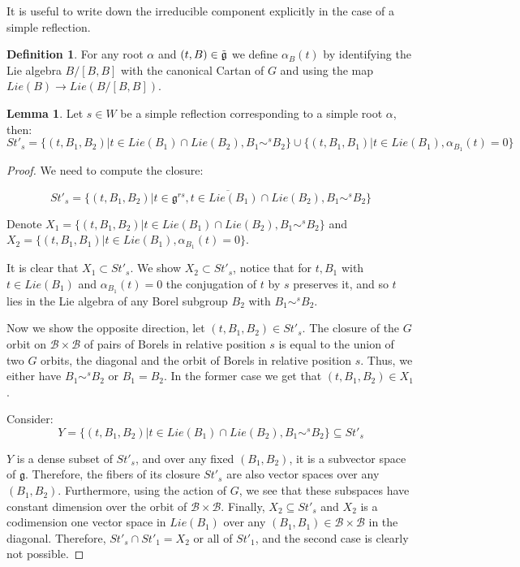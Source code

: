 \documentclass[12pt]{article}
\newcommand{\B}{\mathcal{B}}
\theoremstyle{plain}
\theoremstyle{definition}
\newtheorem{lemma}[theorem]{Lemma}
\newtheorem{defn}[theorem]{Definition}
\begin{document}
It is useful to write down the irreducible component explicitly in the case of a simple reflection. 


\begin{defn}\label{def:functionl alpha_s}
For any root $\alpha$ and $(t,B)\in \Tilde{\mathfrak{g}}$ we define $\alpha_B(t)$ by identifying the Lie algebra $B/[B,B]$ with the canonical Cartan of $G$ and using the map $Lie(B)\rightarrow Lie(B/[B,B])$.    
\end{defn}

\begin{lemma}\label{simple reflection steinberg}
    Let $s\in W$ be a simple reflection corresponding to a simple root $\alpha$, then: $$St'_{s}=\{(t,B_{1},B_{2})|t\in Lie(B_{1})\cap Lie(B_{2}),B_{1}\sim^{s} B_{2}\}\cup \{(t,B_1,B_1)| t\in Lie(B_1),\alpha_{B_1}(t)=0\}$$
\end{lemma}

\begin{proof}
    We need to compute the closure:

    $$St'_s=\overline{\{(t,B_1,B_2)|t\in \mathfrak{g}^{rs}, t\in Lie(B_1)\cap Lie(B_2), B_1\sim^sB_2\}}$$ 


    Denote $X_1=\{(t,B_{1},B_{2})|t\in Lie(B_{1})\cap Lie(B_{2}),B_{1}\sim^{s} B_{2}\}$ and $X_2=\{(t,B_1,B_1)| t\in Lie(B_1),\alpha_{B_1}(t)=0\}$. 
    
    It is clear that $X_1\subset St'_s$. We show $X_2\subset St'_s$, notice that for $t,B_1$ with $t\in Lie(B_1)$ and $\alpha_{B_1}(t)=0$ the conjugation of $t$ by $s$ preserves it, and so $t$ lies in the Lie algebra of any Borel subgroup $B_2$ with $B_1\sim^sB_2$.

    Now we show the opposite direction, let $(t,B_1,B_2)\in St'_s$. The closure of the $G$ orbit on $\B\times \B$ of pairs of Borels in relative position $s$ is equal to the union of two $G$ orbits, the diagonal and the orbit of Borels in relative position $s$. Thus, we either have $B_1\sim^s B_2$ or $B_1=B_2$. In the former case we get that $(t,B_1,B_2)\in X_1$. 

    Consider:
    $$ Y=\{(t,B_1,B_2)| t\in Lie(B_1)\cap Lie(B_2), B_1\sim^sB_2\} \subseteq St'_{s}$$

    $Y$ is a dense subset of $St'_s$, and over any fixed $(B_{1},B_{2})$, it is a subvector space of $\mathfrak{g}$. Therefore, the fibers of its closure $St'_{s}$ are also vector spaces over any $(B_{1},B_{2})$. Furthermore, using the action of $G$, we see that these subspaces have constant dimension over the orbit of $\B\times\B$. Finally, $X_{2}\subseteq St'_{s}$ and $X_{2}$ is a codimension one vector space in $Lie(B_1)$ over any $(B_{1},B_{1})\in\B\times\B$ in the diagonal. Therefore, $St'_{s}\cap St'_{1}=X_{2}$ or all of $St'_{1}$, and the second case is clearly not possible. 
    
\end{proof}
\end{document}
